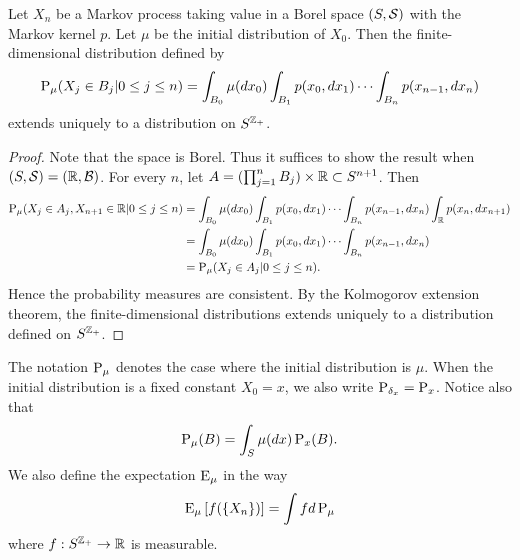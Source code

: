 \begin{theorem}
    Let $X_n$ be a Markov process taking value in a Borel space $(S,\S)$ with 
    the Markov kernel $p$. Let $\mu$ be the initial distribution of $X_0$. Then 
    the finite-dimensional distribution defined by 
    \begin{equation*}
        \P_{\mu}(X_j\in B_j|0\leq j\leq n) = \int_{B_0}\mu(dx_0)\int_{B_1}p(x_0,dx_1)\cdots\int_{B_n}p(x_{n-1},dx_n)
    \end{equation*}
    extends uniquely to a distribution on $S^{\Z_+}$. 
\end{theorem}
\begin{proof}
    Note that the space is Borel. Thus it suffices to show the result when 
    $(S,\S) = (\R,\B)$. For every $n$, let $A = (\prod_{j=1}^n B_j)\times\R 
    \subset S^{n+1}$. Then 
    \begin{equation*}
        \begin{split}
            \P_{\mu}(X_j\in A_j, X_{n+1}\in \R|0\leq j\leq n) 
            &= \int_{B_0}\mu(dx_0)\int_{B_1}p(x_0,dx_1)\cdots\int_{B_n}p(x_{n-1},dx_n)\int_{\R}p(x_n,dx_{n+1}) \\
            &= \int_{B_0}\mu(dx_0)\int_{B_1}p(x_0,dx_1)\cdots\int_{B_n}p(x_{n-1},dx_n) \\
            &= \P_{\mu}(X_j\in A_j|0\leq j\leq n).
        \end{split}
    \end{equation*}
    Hence the probability measures are consistent. By the Kolmogorov extension 
    theorem, the finite-dimensional distributions extends uniquely to a 
    distribution defined on $S^{\Z_+}$. 
\end{proof}
\begin{remark}
    The notation $\P_\mu$ denotes the case where the initial distribution is $\mu$. 
    When the initial distribution is a fixed constant $X_0 = x$, we also write 
    $\P_{\delta_x} = \P_x$. Notice also that 
    \begin{equation*}
        \P_\mu(B) = \int_S \mu(dx)\P_x(B). 
    \end{equation*} 
    We also define the expectation $\E_\mu$ in the way 
    \begin{equation*}
        \E_\mu\sbrc{f(\set{X_n})} = \int fd\P_\mu
    \end{equation*}
    where $f:S^{\Z_+}\to \R$ is measurable.  
\end{remark}

